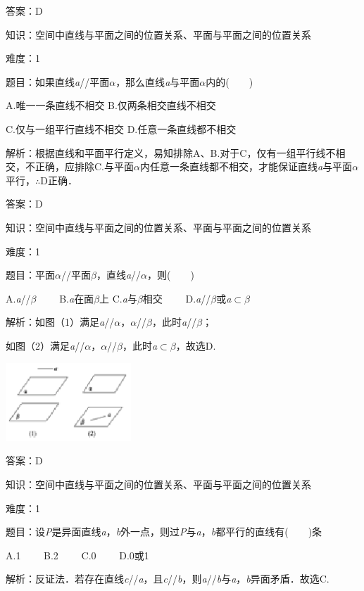 \documentclass{article} %
\begin{document}
答案：D

知识：空间中直线与平面之间的位置关系、平面与平面之间的位置关系

难度：1

题目：如果直线\textit{a}//平面\textit{$\alpha$}，那么直线\textit{a}与平面\textit{$\alpha$}内的(　　)

A.唯一一条直线不相交 B.仅两条相交直线不相交

C.仅与一组平行直线不相交 D.任意一条直线都不相交

解析：根据直线和平面平行定义，易知排除A、B.对于C，仅有一组平行线不相交，不正确，应排除C.与平面\textit{$\alpha$}内任意一条直线都不相交，才能保证直线\textit{a}与平面\textit{$\alpha$}平行，$\mathrm{\therefore}$D正确．

答案：D

知识：空间中直线与平面之间的位置关系、平面与平面之间的位置关系

难度：1

题目：平面\textit{$\alpha$}//平面\textit{$\beta$}，直线\textit{a}//\textit{$\alpha$}，则(　　)

A.\textit{a}//\textit{$\beta$}　　 B.\textit{a}在面\textit{$\beta$}上 C.\textit{a}与\textit{$\beta$}相交　　 D.\textit{a}//\textit{$\beta$}或\textit{a}$\mathrm{\subset }$\textit{$\beta$}

解析：如图（1）满足\textit{a}//\textit{$\alpha$}，\textit{$\alpha$}//\textit{$\beta$}，此时\textit{a}//\textit{$\beta$}；

如图（2）满足\textit{a}//\textit{$\alpha$}，\textit{$\alpha$}//\textit{$\beta$}，此时\textit{a}$\mathrm{\subset }$\textit{$\beta$}，故选D.

\includegraphics*[width=1.86in, height=1.16in, keepaspectratio=false]{image120}

答案：D

知识：空间中直线与平面之间的位置关系、平面与平面之间的位置关系

难度：1

题目：设\textit{P}是异面直线\textit{a}，\textit{b}外一点，则过\textit{P}与\textit{a}，\textit{b}都平行的直线有(　　)条

A.1　　 B.2　　 C.0　　 D.0或1

解析：反证法．若存在直线\textit{c}//\textit{a}，且\textit{c}//\textit{b}，则\textit{a}//\textit{b}与\textit{a}，\textit{b}异面矛盾．故选C.
\end{document}
